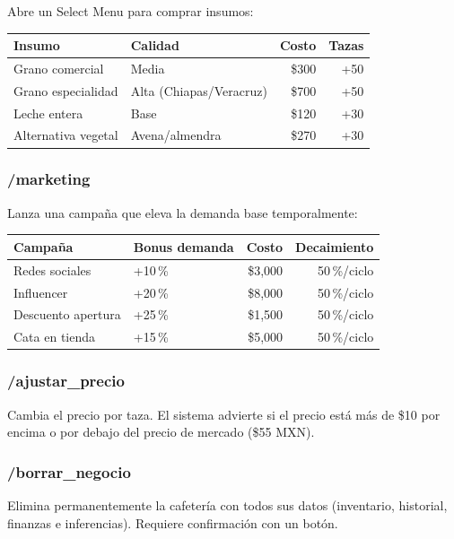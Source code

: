 \documentclass[12pt,spanish]{article}
\begin{document}
Abre un Select Menu para comprar insumos:

\begin{center}
\begin{tabular}{llrr}
  \toprule
  Insumo & Calidad & Costo & Tazas \\
  \midrule
  Grano comercial & Media & \$300 & +50 \\
  Grano especialidad & Alta (Chiapas/Veracruz) & \$700 & +50 \\
  Leche entera & Base & \$120 & +30 \\
  Alternativa vegetal & Avena/almendra & \$270 & +30 \\
  \bottomrule
\end{tabular}
\end{center}

\subsubsection*{/marketing}

Lanza una campaña que eleva la demanda base temporalmente:

\begin{center}
\begin{tabular}{llrr}
  \toprule
  Campaña & Bonus demanda & Costo & Decaimiento \\
  \midrule
  Redes sociales & +10\,\% & \$3,000 & 50\,\%/ciclo \\
  Influencer & +20\,\% & \$8,000 & 50\,\%/ciclo \\
  Descuento apertura & +25\,\% & \$1,500 & 50\,\%/ciclo \\
  Cata en tienda & +15\,\% & \$5,000 & 50\,\%/ciclo \\
  \bottomrule
\end{tabular}
\end{center}

\subsubsection*{/ajustar\_precio}

Cambia el precio por taza. El sistema advierte si el precio está
más de \$10 por encima o por debajo del precio de mercado (\$55 MXN).

\subsubsection*{/borrar\_negocio}

Elimina permanentemente la cafetería con todos sus datos (inventario,
historial, finanzas e inferencias). Requiere confirmación con un botón.
\end{document}
